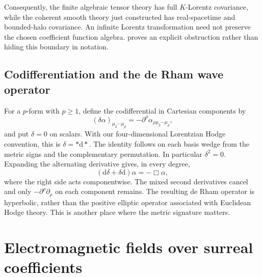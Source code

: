 \documentclass[11pt,letterpaper]{article}
\theoremstyle{definition}
\theoremstyle{remark}
\newcommand{\dd}{\mathrm d}
\begin{document}
Consequently, the finite algebraic tensor theory has full $K$-Lorentz covariance, while the coherent smooth theory just constructed has real-spacetime and bounded-halo covariance. An infinite Lorentz transformation need not preserve the chosen coefficient function algebra.  proves an explicit obstruction rather than hiding this boundary in notation.

\subsection{Codifferentiation and the de Rham wave operator}
For a $p$-form with $p\geq1$, define the codifferential in Cartesian components by
\begin{equation}
 (\delta\alpha)_{\mu_2\cdots\mu_p}
 =-\partial^\rho\alpha_{\rho\mu_2\cdots\mu_p},
\end{equation}
and put $\delta=0$ on scalars. With our four-dimensional Lorentzian Hodge convention, this is $\delta=*\dd*$. The identity follows on each basis wedge from the metric signs and the complementary permutation. In particular $\delta^2=0$. Expanding the alternating derivative gives, in every degree,
\begin{equation}
 (\dd\delta+\delta\dd)\alpha=-\Box\alpha,
\end{equation}
where the right side acts componentwise. The mixed second derivatives cancel and only $-\partial^\rho\partial_\rho$ on each component remains. The resulting de Rham operator is hyperbolic, rather than the positive elliptic operator associated with Euclidean Hodge theory. This is another place where the metric signature matters.

\section{Electromagnetic fields over surreal coefficients}\label{vtf:mink:sec:maxwell}
\end{document}
